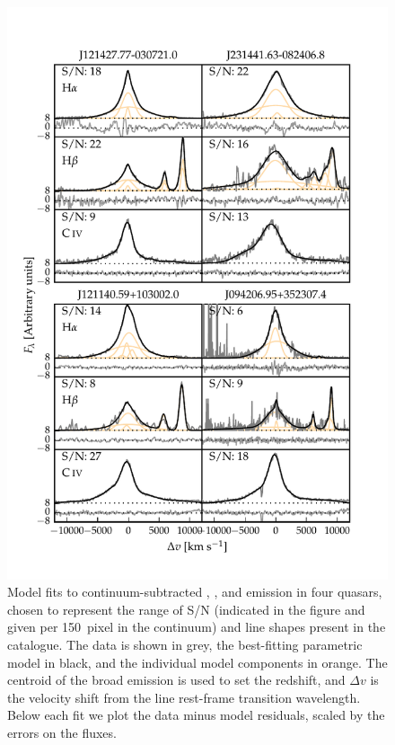 \begin{figure}
    \centering
    \includegraphics[width=\linewidth]{figures/chapter03/example_spectrum_grid.pdf} 
    \caption{Model fits to continuum-subtracted \hans, \hbns, and  emission in four quasars, chosen to represent the range of S/N (indicated in the figure and given per 150\kms\, pixel in the continuum) and line shapes present in the catalogue. The data is shown in grey, the best-fitting parametric model in black, and the individual model components in orange. The centroid of the broad \ha emission is used to set the redshift, and $\Delta{v}$ is the velocity shift from the line rest-frame transition wavelength. Below each fit we plot the data minus model residuals, scaled by the errors on the fluxes.} 
    \label{fig:examplegrid}
\end{figure}


